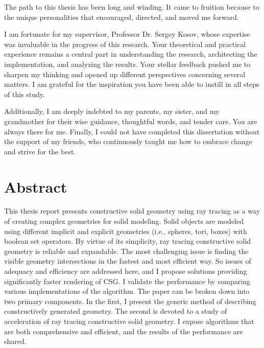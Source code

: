 \documentclass[a4paper,11pt,oneside]{article}
\begin{document}
The path to this thesis has been long and winding. It came to fruition because to the unique personalities that encouraged, directed, and moved me forward.

I am fortunate for my supervisor, Professor Dr. Sergey Kosov, whose expertise was invaluable in the progress of this research. Your theoretical and practical experience remains a central part in understanding the research, architecting the implementation, and analyzing the results.  Your stellar feedback pushed me to sharpen my thinking and opened up different perspectives concerning several matters. I am grateful for the inspiration you have been able to instill in all steps of this study.

Additionally, I am deeply indebted to my parents, my sister, and my grandmother for their wise guidance, thoughtful words, and tender care. You are always there for me. Finally, I could not have completed this dissertation without the support of my friends, who continuously taught me how to embrace change and strive for the best.

\newpage

\section*{Abstract}
   
This thesis report presents constructive solid geometry using ray tracing as a way of creating complex geometries for solid modeling. Solid objects are modeled using different implicit and explicit geometries (i.e., spheres, tori, boxes) with boolean set operators. By virtue of its simplicity, ray tracing constructive solid geometry is reliable and expandable. The most challenging issue is finding the visible geometry intersections in the fastest and most efficient way. So issues of adequacy and efficiency are addressed here, and I propose solutions providing significantly faster rendering of CSG. I validate the performance by comparing various implementations of the algorithm. 
The paper can be broken down into two primary components. In the first, I present the generic method of describing constructively generated geometry. The second is devoted to a study of acceleration of ray tracing constructive solid geometry. I expose algorithms that are both comprehensive and efficient, and the results of the performance are shared.
   
\newpage
\tableofcontents

\clearpage
{}
\end{document}
